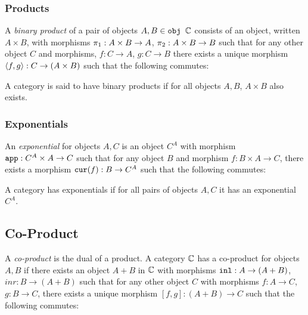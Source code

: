 \documentclass{Report}
\begin{document}
\subsubsection{Products}
A \textit{binary product} of a pair of objects $A, B\in\texttt{obj }\mathbb{C}$ consists of an object, written $A \times B$, with morphisms $\pi_1: A\times B\rightarrow A$, $\pi_2: A\times B \rightarrow B$ such that for any other object $C$ and morphisms, $f: C\rightarrow A$, $g: C\rightarrow B$ there exists a unique morphism $\left\langle f, g\right\rangle: C \rightarrow (A\times B)$ such that the following commutes:


A category is said to have binary products if for all objects $A, B$, $A\times B$ also exists.

\subsubsection{Exponentials}
An \textit{exponential} for objects $A, C$ is an object $C^A$ with morphism $\texttt{app}: C^A\times A \rightarrow C$ such that for any object $B$ and morphism $f: B\times A \rightarrow C$, there exists a morphism $\texttt{cur}(f): B \rightarrow C^A$ such that the following commutes:


A category has exponentials if for all pairs of objects $A, C$ it has an exponential $C^A$.

\subsection{Co-Product}
A \textit{co-product} is the dual of a product. A category $\mathbb{C}$ has a co-product for objects $A, B$ if there exists an object $A+B$ in $\mathbb{C}$ with morphisms $\texttt{inl}: A\rightarrow (A+B)$, $inr: B\rightarrow (A+B)$ such that for any other object $C$ with morphisms $f: A\rightarrow C$, $g: B\rightarrow C$, there exists a unique morphism $[f, g]: (A + B)\rightarrow C $ such that the following commutes:
\end{document}
